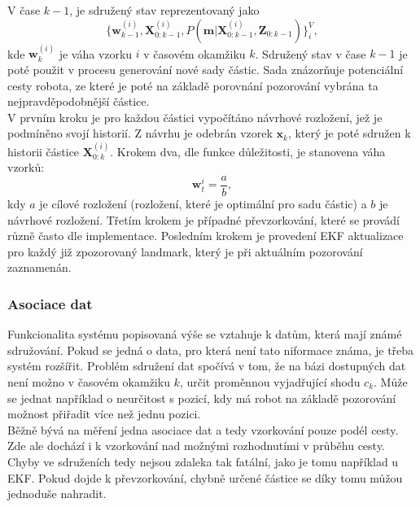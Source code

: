 \documentclass[12pt]{report}
\begin{document}
\indent V čase $k-1$, je sdružený stav reprezentovaný jako 
\begin{equation}
	\{\textbf{w}^{(i)}_{k-1},\textbf{X}^{(i)}_{0:k-1},P(\textbf{m}|\textbf{X}^{(i)}_{0:k-1},\textbf{Z}_{0:k-1})\}^V_i,
\end{equation}
kde $\textbf{w}^{(i)}_{k}$ je váha vzorku $i$ v časovém okamžiku $k$. Sdružený stav v čase $k-1$ je poté použit v procesu generování nové sady částic. Sada znázorňuje potenciální cesty robota, ze které je poté na základě porovnání pozorování vybrána ta nejpravděpodobnější částice.\\
\indent V prvním kroku je pro každou částici vypočítáno návrhové rozložení, jež je podmíněno svojí historií. Z návrhu je odebrán vzorek $\textbf{x}_k$, který je poté sdružen k historii částice $\textbf{X}^{(i)}_{0:k}$. Krokem dva, dle funkce důležitosti, je stanovena váha vzorků:
\begin{equation}
	\textbf{w}_t^i=\frac{a}{b},
\end{equation}
kdy $a$ je cílové rozložení (rozložení, které je optimální pro sadu částic) a $b$ je návrhové rozložení. Třetím krokem je případné převzorkování, které se provádí různě často dle implementace. Posledním krokem je provedení EKF aktualizace pro každý již zpozorovaný landmark, který je při aktuálním pozorování zaznamenán. \\

\subsubsection{Asociace dat}
Funkcionalita systému popisovaná výše se vztahuje k datům, která mají známé sdružování. Pokud se jedná o data, pro která není tato niformace známa, je třeba systém rozšířit. Problém sdružení dat spočívá v tom, že na bázi dostupných dat není možno v časovém okamžiku $k$, určit proměnnou vyjadřující shodu $c_k$. Může se jednat například o neurčitost s pozicí, kdy má robot na základě pozorování možnost přiřadit více než jednu pozici.\\
\indent Běžně bývá na měření jedna asociace dat a tedy vzorkování pouze podél cesty. Zde ale dochází i k vzorkování nad možnými rozhodnutími v průběhu cesty. Chyby ve sdruženích tedy nejsou zdaleka tak fatální, jako je tomu například u EKF. Pokud dojde k převzorkování, chybně určené částice se díky tomu můžou jednoduše nahradit.
\end{document}
